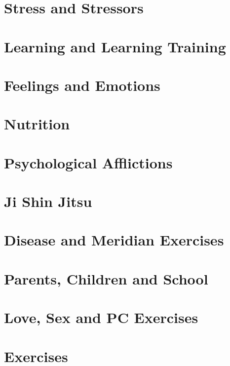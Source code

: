 \documentclass[makeidx]{book}
\begin{document}
\doparttoc
\frontmatter



%

\mainmatter
\part{Stress and Stressors}
\parttoc


\part{Learning and Learning Training}

\parttoc


\part{Feelings and Emotions}
\part{Nutrition}

\parttoc



\part{Psychological Afflictions}
\part{Ji Shin Jitsu}
\part{Disease and Meridian Exercises}
\part{Parents, Children and School}
\part{Love, Sex and PC Exercises}
\part{Exercises}


{}

\backmatter
\printindex
\end{document}
